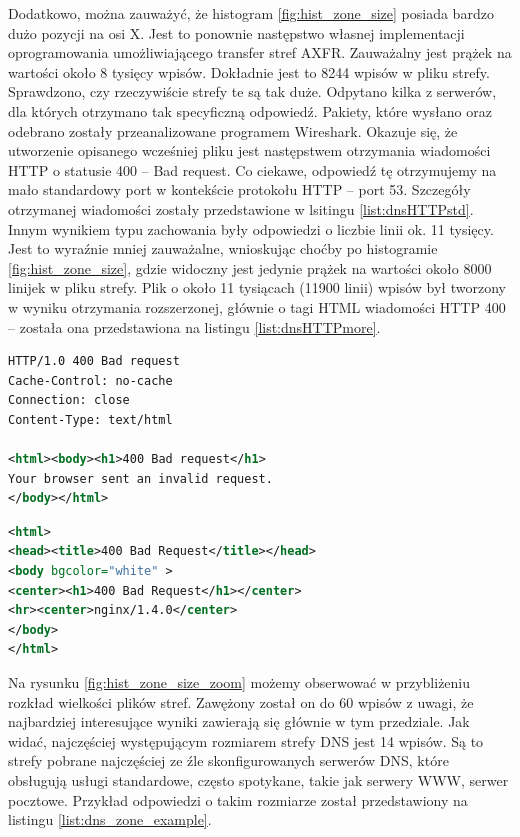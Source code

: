 Dodatkowo, można zauważyć, że histogram \ref{fig:hist_zone_size} posiada bardzo dużo pozycji na osi X. Jest to ponownie następstwo
własnej implementacji oprogramowania umożliwiającego transfer stref AXFR. Zauważalny jest prążek na wartości około 8 tysięcy
wpisów. Dokładnie jest to 8244 wpisów w pliku strefy. Sprawdzono, czy rzeczywiście strefy te są tak duże. Odpytano kilka z serwerów,
dla których otrzymano tak specyficzną odpowiedź. Pakiety, które wysłano oraz odebrano zostały przeanalizowane programem Wireshark.
Okazuje się, że utworzenie opisanego wcześniej pliku jest następstwem otrzymania wiadomości HTTP o statusie 400 -- Bad request.
Co ciekawe, odpowiedź tę otrzymujemy na mało standardowy port w kontekście protokołu HTTP -- port 53. Szczegóły otrzymanej wiadomości
zostały przedstawione w lsitingu \ref{list:dnsHTTPstd}. Innym wynikiem typu zachowania były odpowiedzi o liczbie linii ok. 11 tysięcy.
Jest to wyraźnie mniej zauważalne, wnioskując choćby po histogramie \ref{fig:hist_zone_size}, gdzie widoczny jest jedynie prążek na
wartości około 8000 linijek w pliku strefy. Plik o około 11 tysiącach (11900 linii) wpisów był tworzony w wyniku otrzymania rozszerzonej,
głównie o tagi HTML wiadomości HTTP 400 -- została ona przedstawiona na listingu \ref{list:dnsHTTPmore}.

\begin{lstlisting}[label={list:dnsHTTPstd},captionpos=b,caption=Odpowiedź HTTP 400 na zapytanie DNS.,language=xml]
HTTP/1.0 400 Bad request
Cache-Control: no-cache
Connection: close
Content-Type: text/html

<html><body><h1>400 Bad request</h1>
Your browser sent an invalid request.
</body></html>
\end{lstlisting}

\begin{lstlisting}[label={list:dnsHTTPmore},captionpos=b,caption=Rozszerzona odpowiedź HTTP 400 na zapytanie DNS.,language=xml]
<html>
<head><title>400 Bad Request</title></head>
<body bgcolor="white" >
<center><h1>400 Bad Request</h1></center>
<hr><center>nginx/1.4.0</center>
</body>
</html>
\end{lstlisting}

Na rysunku \ref{fig:hist_zone_size_zoom} możemy obserwować w przybliżeniu rozkład wielkości plików stref. Zawężony został on do 60
wpisów z uwagi, że najbardziej interesujące wyniki zawierają się głównie w tym przedziale. Jak widać, najczęściej występującym
rozmiarem strefy DNS jest 14 wpisów. Są to strefy pobrane najczęściej ze źle skonfigurowanych serwerów DNS, które obsługują usługi
standardowe, często spotykane, takie jak serwery WWW, serwer pocztowe. Przykład odpowiedzi o takim rozmiarze został przedstawiony na
listingu \ref{list:dns_zone_example}.

